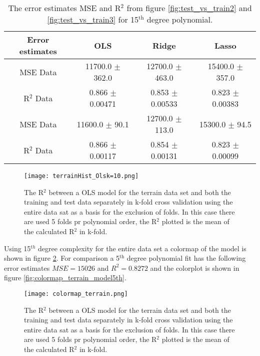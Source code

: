 \documentclass[uio,jmp,amsmath,amssymb,reprint,nofootinbib]{revtex4-1}
\numberwithin{equation}{section}
\begin{document}
\begin{table}
\begin{tabular}{|c|c|c|c|}\hline
Error estimates & OLS & Ridge & Lasso\\ \hline
MSE Data & 11700.0 \(\pm\) 362.0 & 12700.0 \(\pm\) 463.0 & 15400.0 \(\pm\) 357.0 \\ \hline
R\(^2\) Data & 0.866 \(\pm\) 0.00471 & 0.853 \(\pm\) 0.00533 & 0.823 \(\pm\) 0.00383 \\ \hline
MSE Data & 11600.0 \(\pm\) 90.1 & 12700.0 \(\pm\) 113.0 & 15300.0 \(\pm\) 94.5 \\ \hline
R\(^2\) Data & 0.866 \(\pm\) 0.00117 & 0.854 \(\pm\) 0.00131 & 0.823 \(\pm\) 0.00099 \\ \hline
\end{tabular}
\caption{The error estimates MSE and R\(^2\) from figure \ref{fig:test_vs_train2} and \ref{fig:test_vs_train3} for 15\(^\text{th}\) degree polynomial.}
\label{tab:12}
\end{table}

\begin{figure}[H]
    \centering
    \texttt{[image: terrainHist\_Olsk=10.png]}
    \caption{The R\(^2\) between a OLS model for the terrain data set and both the training and test data separately in k-fold cross validation using the entire data sat as a basis for the exclusion of folds. In this case there are used 5 folds pr polynomial order, the R\(^2\) plotted is the mean of the calculated R\(^2\) in k-fold.}
    \label{fig:hist_terrain_ols}
\end{figure}

Using 15\(^{th}\) degree complexity for the entire data set a colormap of the model is shown in figure \ref{fig:colormap_terrain_model}. For comparison a 5\(^\text{th}\) degree polynomial fit has the following error estimates \(MSE = 15026\) and \(R^2 = 0.8272\) and the colorplot is shown in figure \ref{fig:colormap_terrain_model5th}.

\begin{figure}[H]
    \centering
    \texttt{[image: colormap\_terrain.png]}
    \caption{The R\(^2\) between a OLS model for the terrain data set and both the training and test data separately in k-fold cross validation using the entire data sat as a basis for the exclusion of folds. In this case there are used 5 folds pr polynomial order, the R\(^2\) plotted is the mean of the calculated R\(^2\) in k-fold.}
    \label{fig:colormap_terrain_model}
\end{figure}
\end{document}
